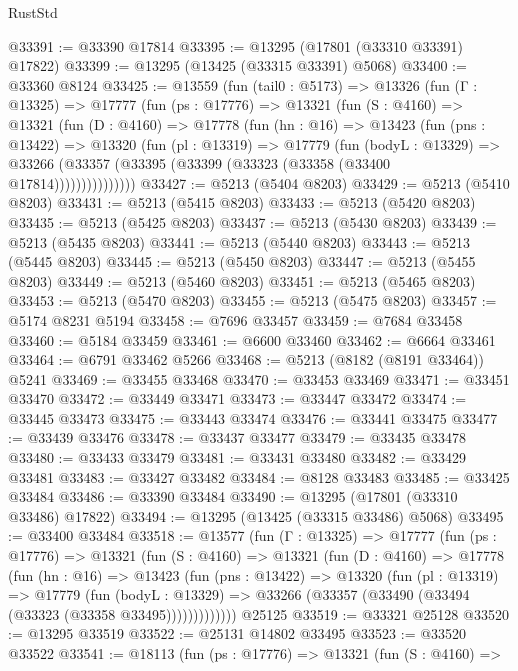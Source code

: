 \begin{lexlean}{RustStd}
\begin{coremodule}
@33391 := @33390 @17814
@33395 := @13295 (@17801 (@33310 @33391) @17822)
@33399 := @13295 (@13425 (@33315 @33391) @5068)
@33400 := @33360 @8124
@33425 := @13559
    (fun (tail0 : @5173) =>
    @13326
      (fun (Γ : @13325) =>
      @17777
        (fun (ps : @17776) =>
        @13321
          (fun (S : @4160) =>
          @13321
            (fun (D : @4160) =>
            @17778
              (fun (hn : @16) =>
              @13423
                (fun (pns : @13422) =>
                @13320
                  (fun (pl : @13319) =>
                  @17779
                    (fun (bodyL : @13329) =>
                    @33266 (@33357 (@33395 (@33399 (@33323 (@33358 (@33400 @17814)))))))))))))))
@33427 := @5213 (@5404 @8203)
@33429 := @5213 (@5410 @8203)
@33431 := @5213 (@5415 @8203)
@33433 := @5213 (@5420 @8203)
@33435 := @5213 (@5425 @8203)
@33437 := @5213 (@5430 @8203)
@33439 := @5213 (@5435 @8203)
@33441 := @5213 (@5440 @8203)
@33443 := @5213 (@5445 @8203)
@33445 := @5213 (@5450 @8203)
@33447 := @5213 (@5455 @8203)
@33449 := @5213 (@5460 @8203)
@33451 := @5213 (@5465 @8203)
@33453 := @5213 (@5470 @8203)
@33455 := @5213 (@5475 @8203)
@33457 := @5174 @8231 @5194
@33458 := @7696 @33457
@33459 := @7684 @33458
@33460 := @5184 @33459
@33461 := @6600 @33460
@33462 := @6664 @33461
@33464 := @6791 @33462 @5266
@33468 := @5213 (@8182 (@8191 @33464)) @5241
@33469 := @33455 @33468
@33470 := @33453 @33469
@33471 := @33451 @33470
@33472 := @33449 @33471
@33473 := @33447 @33472
@33474 := @33445 @33473
@33475 := @33443 @33474
@33476 := @33441 @33475
@33477 := @33439 @33476
@33478 := @33437 @33477
@33479 := @33435 @33478
@33480 := @33433 @33479
@33481 := @33431 @33480
@33482 := @33429 @33481
@33483 := @33427 @33482
@33484 := @8128 @33483
@33485 := @33425 @33484
@33486 := @33390 @33484
@33490 := @13295 (@17801 (@33310 @33486) @17822)
@33494 := @13295 (@13425 (@33315 @33486) @5068)
@33495 := @33400 @33484
@33518 := @13577
    (fun (Γ : @13325) =>
    @17777
      (fun (ps : @17776) =>
      @13321
        (fun (S : @4160) =>
        @13321
          (fun (D : @4160) =>
          @17778
            (fun (hn : @16) =>
            @13423
              (fun (pns : @13422) =>
              @13320
                (fun (pl : @13319) =>
                @17779
                  (fun (bodyL : @13329) =>
                  @33266 (@33357 (@33490 (@33494 (@33323 (@33358 @33495)))))))))))))
    @25125
@33519 := @33321 @25128
@33520 := @13295 @33519
@33522 := @25131 @14802 @33495
@33523 := @33520 @33522
@33541 := @18113
    (fun (ps : @17776) =>
    @13321
      (fun (S : @4160) =>

\end{coremodule}
\end{lexlean}
